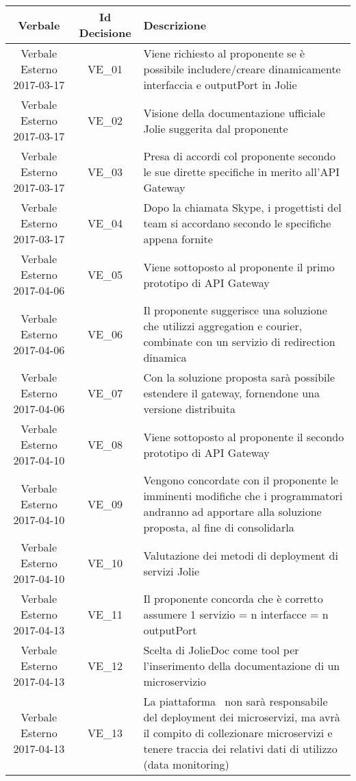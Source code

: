 \begin{longtable}[H]{|c|c|p{7cm}|}
			\hline
			\textbf{Verbale} & \textbf{Id Decisione}	& \textbf{Descrizione} \\
			\hline
			Verbale Esterno 2017-03-17 & VE\_01	& Viene richiesto al proponente se è possibile includere/creare dinamicamente interfaccia e outputPort in Jolie	\\
			\hline
			Verbale Esterno 2017-03-17 & VE\_02 & Visione della documentazione ufficiale Jolie suggerita dal proponente \\
			\hline
			Verbale Esterno 2017-03-17 & VE\_03 & Presa di accordi col proponente secondo le sue dirette specifiche in merito all'API Gateway \\
			\hline
			Verbale Esterno 2017-03-17 & VE\_04 & Dopo la chiamata Skype, i progettisti del team si accordano secondo le specifiche appena fornite \\
			\hline
			Verbale Esterno 2017-04-06 & VE\_05	& Viene sottoposto al proponente il primo prototipo di API Gateway \\
			\hline
			Verbale Esterno 2017-04-06 & VE\_06 &  Il proponente suggerisce una soluzione che utilizzi aggregation e courier, combinate con un servizio di redirection dinamica \\
			\hline
			Verbale Esterno 2017-04-06 & VE\_07 & Con la soluzione proposta sarà possibile estendere il gateway, fornendone una versione distribuita\\
			\hline
			Verbale Esterno 2017-04-10 & VE\_08	& Viene sottoposto al proponente il secondo prototipo di API Gateway \\
			\hline
			Verbale Esterno 2017-04-10 & VE\_09 & Vengono concordate con il proponente le imminenti modifiche che i programmatori andranno ad apportare alla soluzione proposta, al fine di consolidarla \\
			\hline
			Verbale Esterno 2017-04-10 & VE\_10 & Valutazione dei metodi di deployment di servizi Jolie\\
			\hline
			Verbale Esterno 2017-04-13 & VE\_11	&  Il proponente concorda che è corretto assumere 1 servizio = n interfacce = n outputPort \\
			\hline
			Verbale Esterno 2017-04-13 & VE\_12 &  Scelta di JolieDoc come tool per l'inserimento della documentazione di un microservizio \\
			\hline
			Verbale Esterno 2017-04-13 & VE\_13 & La piattaforma \progetto\ non sarà responsabile del deployment dei microservizi, ma avrà il compito di collezionare microservizi e tenere traccia dei relativi dati di utilizzo (data monitoring) \\

\end{longtable}
